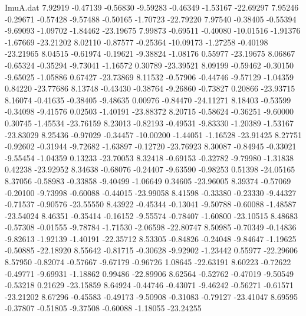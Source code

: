 \begin{filecontents}{ImuA.dat}
   7.92919   -0.47139   -0.56830   -9.59283   -0.46349   -1.53167  -22.69297
   7.95246   -0.29671   -0.57428   -9.57488   -0.50165   -1.70723  -22.79220
   7.97540   -0.38405   -0.55394   -9.69093   -1.09702   -1.84462  -23.19675
   7.99873   -0.69511   -0.40080  -10.01516   -1.91376   -1.67669  -23.21202
   8.02110   -0.87577   -0.25364  -10.09173   -1.27258   -0.40198  -23.21965
   8.04515   -0.61974   -0.19621   -9.38824   -1.08176    0.55977  -23.19675
   8.06867   -0.65324   -0.35294   -9.73041   -1.16572    0.30789  -23.39521
   8.09199   -0.59462   -0.30150   -9.65025   -1.05886    0.67427  -23.73869
   8.11532   -0.57906   -0.44746   -9.57129   -1.04359    0.84220  -23.77686
   8.13748   -0.43430   -0.38764   -9.26860   -0.73827    0.20866  -23.93715
   8.16074   -0.41635   -0.38405   -9.48635    0.00976   -0.84470  -24.11271
   8.18403   -0.53599   -0.34098   -9.41576    0.02503   -1.40191  -23.88372
   8.20715   -0.58624   -0.36251   -9.60000    0.30745   -1.45534  -23.76159
   8.23013   -0.82193   -0.49531   -9.83330   -1.20389   -1.53167  -23.83029
   8.25436   -0.97029   -0.34457  -10.00200   -1.44051   -1.16528  -23.91425
   8.27751   -0.92602   -0.31944   -9.72682   -1.63897   -0.12720  -23.76923
   8.30087   -0.84945   -0.33021   -9.55454   -1.04359    0.13233  -23.70053
   8.32418   -0.69153   -0.32782   -9.79980   -1.31838    0.42238  -23.92952
   8.34638   -0.68076   -0.24407   -9.63590   -0.98253    0.51398  -24.05165
   8.37056   -0.58983   -0.33858   -9.40499   -1.06649    0.34605  -23.96005
   8.39374   -0.57069   -0.20100   -9.73998   -0.60088   -0.44015  -23.99058
   8.41598   -0.33380   -0.23330   -9.44327   -0.71537   -0.90576  -23.55550
   8.43922   -0.45344   -0.13041   -9.50788   -0.60088   -1.48587  -23.54024
   8.46351   -0.35414   -0.16152   -9.55574   -0.78407   -1.60800  -23.10515
   8.48683   -0.57308   -0.01555   -9.78784   -1.71530   -2.06598  -22.80747
   8.50985   -0.70349   -0.14836   -9.82613   -1.92139   -1.40191  -22.35712
   8.53305   -0.84826   -0.24048   -9.84647   -1.19625   -0.50885  -22.18920
   8.55642   -0.81715   -0.30628   -9.92902   -1.23442    0.55977  -22.29606
   8.57950   -0.82074   -0.57667   -9.67179   -0.96726    1.08645  -22.63191
   8.60223   -0.72622   -0.49771   -9.69931   -1.18862    0.99486  -22.89906
   8.62564   -0.52762   -0.47019   -9.50549   -0.53218    0.21629  -23.15859
   8.64924   -0.44746   -0.43071   -9.46242   -0.56271   -0.61571  -23.21202
   8.67296   -0.45583   -0.49173   -9.50908   -0.31083   -0.79127  -23.41047
   8.69595   -0.37807   -0.51805   -9.37508   -0.60088   -1.18055  -23.24255

\end{filecontents}
